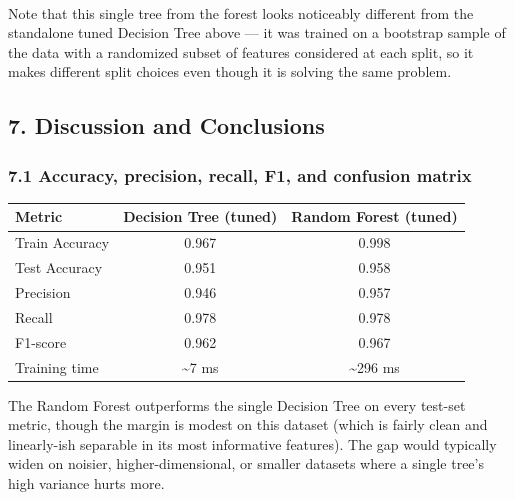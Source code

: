 \documentclass[11pt]{article}
\newcounter{none}
\begin{document}
    \begin{center}
    \end{center}
    { \hspace*{\fill} \\}
    
    Note that this single tree from the forest looks noticeably different
from the standalone tuned Decision Tree above --- it was trained on a
bootstrap sample of the data with a randomized subset of features
considered at each split, so it makes different split choices even
though it is solving the same problem.

    \subsection{7. Discussion and
Conclusions}\label{discussion-and-conclusions}

\subsubsection{7.1 Accuracy, precision, recall, F1, and confusion
matrix}\label{accuracy-precision-recall-f1-and-confusion-matrix}

{\def\LTcaptype{none} %
\begin{longtable}[]{@{}lcc@{}}
\toprule\noalign{}
Metric & Decision Tree (tuned) & Random Forest (tuned) \\
\midrule\noalign{}
\endhead
\bottomrule\noalign{}
\endlastfoot
Train Accuracy & 0.967 & 0.998 \\
Test Accuracy & 0.951 & 0.958 \\
Precision & 0.946 & 0.957 \\
Recall & 0.978 & 0.978 \\
F1-score & 0.962 & 0.967 \\
Training time & \textasciitilde7 ms & \textasciitilde296 ms \\
\end{longtable}
}

The Random Forest outperforms the single Decision Tree on every test-set
metric, though the margin is modest on this dataset (which is fairly
clean and linearly-ish separable in its most informative features). The
gap would typically widen on noisier, higher-dimensional, or smaller
datasets where a single tree's high variance hurts more.
\end{document}
